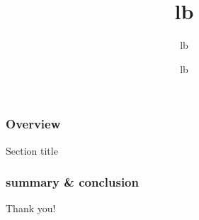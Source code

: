 \documentclass[12pt, compress]{beamer}
\title{{lb}}%
{{ cookiecutter.title }}
{{rb}}
\author{{lb}}%
{{ cookiecutter.author_name }}
\date{{lb}}%
{{ cookiecutter.location }}\\
\begin{document}
\frame{\titlepage}


\begin{frame}
  \frametitle{Overview}
\end{frame}


\begin{frame}
    \vfill \huge \center
      Section title
    \vfill
\end{frame}


\begin{frame}
  \frametitle{summary \& conclusion}
  \begin{center}
    \large Thank you!
  \end{center}
\end{frame}
\end{document}
